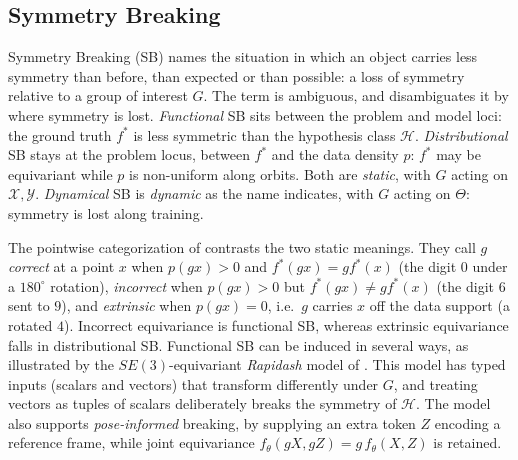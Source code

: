 \documentclass[mathematics,review,submit,moreauthors]{Definitions/mdpi}
\begin{document}
\subsection{Symmetry Breaking}\label{sec:symmetry-breaking-dl}
Symmetry Breaking (SB) names the situation in which an object carries less symmetry than before, than expected or than possible: a loss of symmetry relative to a group of interest $G$.
The term is ambiguous, and  disambiguates it by where symmetry is lost.
\emph{Functional} SB sits between the problem and model loci: the ground truth $f^*$ is less symmetric than the hypothesis class $\mathcal{H}$.
\emph{Distributional} SB stays at the problem locus, between $f^*$ and the data density $p$: $f^*$ may be equivariant while $p$ is non-uniform along orbits.
Both are \emph{static}, with $G$ acting on $\mathcal{X},\mathcal{Y}$.
\emph{Dynamical} SB is \emph{dynamic} as the name indicates, with $G$ acting on $\Theta$: symmetry is lost along training.

The pointwise categorization of \citet{wang2023a} contrasts the two static meanings.
They call $g$ \emph{correct} at a point $x$ when $p(gx)>0$ and $f^*(gx)=gf^*(x)$ (the digit $0$ under a $180^\circ$ rotation), \emph{incorrect} when $p(gx)>0$ but $f^*(gx)\neq gf^*(x)$ (the digit $6$ sent to $9$), and \emph{extrinsic} when $p(gx)=0$, i.e.\ $g$ carries $x$ off the data support (a rotated $4$).
Incorrect equivariance is functional SB, whereas extrinsic equivariance falls in distributional SB.
Functional SB can be induced in several ways, as illustrated by the $SE(3)$-equivariant \emph{Rapidash} model of \citet{vadgama2025}.
This model has typed inputs (scalars and vectors) that transform differently under $G$, and treating vectors as tuples of scalars deliberately breaks the symmetry of $\mathcal{H}$.
The model also supports \emph{pose-informed} breaking, by supplying an extra token $Z$ encoding a reference frame, while joint equivariance $f_\theta(gX,gZ)=g\,f_\theta(X,Z)$ is retained.
\end{document}

